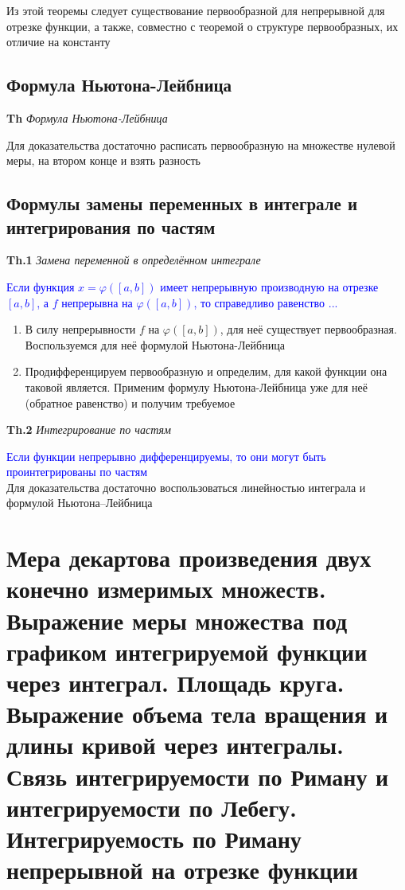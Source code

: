 \documentclass[a4paper, 14pt]{article}
\begin{document}
    Из этой теоремы следует существование первообразной для непрерывной для отрезке функции, а также, совместно с
    теоремой о структуре первообразных, их отличие на константу
    
    \subsection{Формула Ньютона-Лейбница}
    
    \textbf{Th} \textit{Формула Ньютона-Лейбница}
    
    Для доказательства достаточно расписать первообразную на множестве нулевой меры, на втором конце и взять разность
    
    \subsection{Формулы замены переменных в интеграле и интегрирования по частям}
    
    \textbf{Th.1} \textit{Замена переменной в определённом интеграле}
    
    \textcolor{blue}{Если функция $x = \varphi([a, b])$ имеет непрерывную производную на отрезке $[a, b]$, а $f$
        непрерывна на $\varphi([a, b])$, то справедливо равенство ...}
    
    \begin{enumerate}
        \item В силу непрерывности $f$ на $\varphi([a, b])$, для неё существует первообразная.
        Воспользуемся для неё формулой Ньютона-Лейбница
        \item Продифференцируем первообразную и определим, для какой функции она таковой является.
        Применим формулу Ньютона-Лейбница уже для неё (обратное равенство) и получим требуемое
    \end{enumerate}
    
    \textbf{Th.2} \textit{Интегрирование по частям}
    
    \textcolor{blue}{Если функции непрерывно дифференцируемы, то они могут быть проинтегрированы по частям} \\
    
    Для доказательства достаточно воспользоваться линейностью интеграла и формулой Ньютона–Лейбница
    
    \section{Мера декартова произведения двух конечно измеримых множеств.
    Выражение меры множества под графиком интегрируемой функции через интеграл.
    Площадь круга.
    Выражение объема тела вращения и длины кривой через интегралы.
    Связь интегрируемости по Риману и интегрируемости по Лебегу.
    Интегрируемость по Риману непрерывной на отрезке функции}
\end{document}
